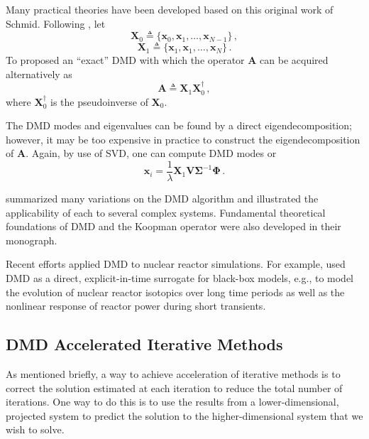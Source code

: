 Many practical theories have been developed based on this original work of Schmid.
Following \citet{tu_dynamic_2014}, let 
\begin{equation}
 \mathbf{X}_0 \triangleq \{\mathbf{x}_0, \mathbf{x}_1, \ldots, \mathbf{x}_{N-1} \}\, ,
 \label{eq:x1}
\end{equation}
\begin{equation}
 \mathbf{X}_1 \triangleq \{\mathbf{x}_1, \mathbf{x}_1, \ldots, \mathbf{x}_{N} \} \, .
 \label{eq:x2}
\end{equation}
To proposed an ``exact'' DMD with which the operator $\mathbf{A}$ can be acquired alternatively as   
\begin{equation}
 \mathbf{A}\triangleq \mathbf{X}_1  \mathbf{X}_0^{\dagger}\, ,
 \label{eq:exact_dmd}
\end{equation}
where $\mathbf{X}_0^{\dagger}$ is the pseudoinverse of $\mathbf{X}_0$. 

The DMD modes and eigenvalues can be found by a direct eigendecomposition; however, it may be too expensive in practice to construct the eigendecomposition of $\mathbf{A}$.
Again, by use of SVD, one can compute DMD modes  or
\begin{equation}
 \mathbf{\mathbf{x}}_i = \frac{1}{\lambda} \mathbf{X}_1 \mathbf{V} \mathbf{\Sigma}^{-1} \mathbf{\Phi} \, .
 \label{eq:exact_dmd_free}
\end{equation}
 
\citet{kutz_dynamic_2016} summarized many variations on the DMD algorithm and illustrated the applicability of each to several complex systems.
Fundamental theoretical foundations of DMD and the Koopman operator were also developed in their monograph.

Recent efforts applied DMD to nuclear reactor simulations. 
For example, \citet{abdo_data-driven_2018} used DMD as a direct, explicit-in-time surrogate for black-box models, e.g., to model the evolution of nuclear reactor isotopics over long time periods as well as the nonlinear response of reactor power during short transients.\cite{abdo_modeling_2019}\cite{elzohery2018comparison}

\subsection{DMD Accelerated Iterative Methods}
As mentioned briefly, a way to achieve acceleration of iterative methods is to correct the solution estimated at each iteration to reduce the total number of iterations.
One way to do this is to use the results from a lower-dimensional, projected system to predict the solution to the higher-dimensional system that we wish to solve.

